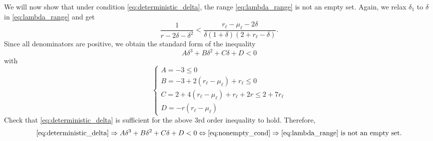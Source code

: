 \documentclass[main.tex]{subfiles}
\begin{document}
We will now show that under condition \eqref{eq:deterministic_delta}, the range \eqref{eq:lambda_range} is not an empty set. Again, we relax $\delta_1$ to $\delta$ in \eqref{eq:lambda_range} and get
\begin{equation}\label{eq:nonempty_cond}
  \frac{1}{r - 2\delta-\delta^2}< \frac{r_{\ell}-\mu_{\ell}-2\delta}{\delta(1+\delta)(2+r_{\ell}-\delta)}.
\end{equation}
Since all denominators are positive, we obtain the standard form of the inequality
$$ A\delta^3+B\delta^2+C\delta+D<0 $$ with
$$
\begin{cases}
A=-3\leq 0\\
B=-3+2(r_\ell-\mu_\ell) + r_\ell \leq 0\\%
C=2+4(r_{\ell}-\mu_{\ell})+r_\ell+2r \leq 2+7r_{\ell}\\%
D=-r(r_{\ell}-\mu_{\ell})
\end{cases}
$$
Check that \eqref{eq:deterministic_delta} is sufficient for the above $3$rd order inequality to hold. Therefore,
$$\eqref{eq:deterministic_delta}\Rightarrow A\delta^3+B\delta^2+C\delta+D<0 \Leftrightarrow \eqref{eq:nonempty_cond}
\Rightarrow \text{\eqref{eq:lambda_range} is not an empty set.}$$
\end{document}

